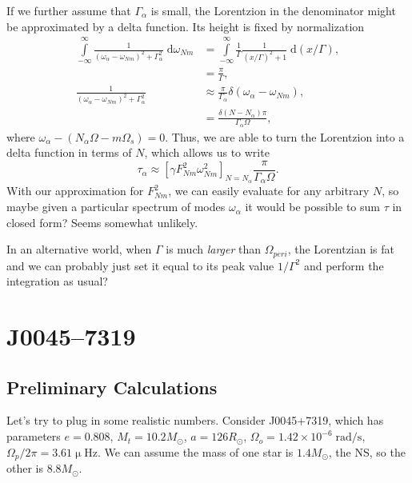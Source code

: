 \documentclass[11pt,
        usenames, %
        dvipsnames %
    ]{article}
\newcommand*{\scinot}[2]{#1\times10^{#2}}
\newcommand*{\p}[1]{\left(#1\right)}
\newcommand*{\s}[1]{\left[#1\right]}
\begin{document}
If we further assume that $\Gamma_{\alpha}$ is small, the Lorentzion in the
denominator might be approximated by a delta function. Its height is fixed by
normalization
\begin{align}
    \int\limits_{-\infty}^\infty \frac{1}{\p{\omega_\alpha - \omega_{Nm}}^2
            + \Gamma_\alpha^2}\;\mathrm{d}\omega_{Nm}
        &= \int\limits_{-\infty}^\infty \frac{1}{\Gamma}
            \frac{1}{(x/\Gamma)^2 + 1}\;\mathrm{d}(x/\Gamma),\\
        &= \frac{\pi}{\Gamma},\\
    \frac{1}{\p{\omega_\alpha - \omega_{Nm}}^2 + \Gamma_\alpha^2}
        &\approx \frac{\pi}{\Gamma_\alpha}\delta\p{\omega_\alpha - \omega_{Nm}}
            ,\\
        &= \frac{\delta\p{N - N_\alpha}\pi}{\Gamma_\alpha\Omega},
\end{align}
where $\omega_\alpha - (N_\alpha \Omega - m\Omega_s) = 0$. Thus, we are able to
turn the Lorentzion into a delta function in terms of $N$, which allows us to
write
\begin{equation}
    \tau_\alpha \approx \s{\gamma F_{Nm}^2 \omega_{Nm}^2}_{N = N_\alpha}
        \frac{\pi}{\Gamma_\alpha \Omega}.
\end{equation}
With our approximation for $F_{Nm}^2$, we can easily evaluate for any arbitrary
$N$, so maybe given a particular spectrum of modes $\omega_\alpha$ it would be
possible to sum $\tau$ in closed form? Seems somewhat unlikely.

In an alternative world, when $\Gamma$ is much \emph{larger} than
$\Omega_{peri}$, the Lorentzian is fat and we can probably just set it equal to
its peak value $1/\Gamma^2$ and perform the integration as usual?

\section{J0045--7319}

\subsection{Preliminary Calculations}

Let's try to plug in some realistic numbers. Consider J0045+7319, which has
parameters $e = 0.808$, $M_t = 10.2M_{\odot}$, $a = 126R_{\odot}$, $\Omega_o =
\scinot{1.42}{-6}\;\mathrm{rad/s}$, $\Omega_p/2\pi = 3.61\upmu\mathrm{Hz}$. We
can assume the mass of one star is $1.4M_{\odot}$, the NS, so the other is
$8.8M_{\odot}$.
\end{document}
